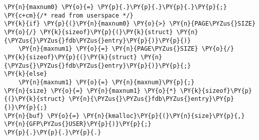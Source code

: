 \begin{Verbatim}[commandchars=\\\{\}]
\PY{n}{maxnum0} \PY{o}{=} \PY{p}{.}\PY{p}{.}\PY{p}{.}\PY{p}{;} \PY{c+cm}{/* read from userspace */} 
\PY{k}{if} \PY{p}{(}\PY{n}{maxnum0} \PY{o}{>} \PY{n}{PAGE\PYZus{}SIZE} \PY{o}{/} \PY{k}{sizeof}\PY{p}{(}\PY{k}{struct} \PY{n}{\PYZus{}\PYZus{}fdb\PYZus{}entry}\PY{p}{)}\PY{p}{)}
    \PY{n}{maxnum1} \PY{o}{=} \PY{n}{PAGE\PYZus{}SIZE} \PY{o}{/} \PY{k}{sizeof}\PY{p}{(}\PY{k}{struct} \PY{n}{\PYZus{}\PYZus{}fdb\PYZus{}entry}\PY{p}{)}\PY{p}{;}
\PY{k}{else}
    \PY{n}{maxnum1} \PY{o}{=} \PY{n}{maxnum}\PY{p}{;}
\PY{n}{size} \PY{o}{=} \PY{n}{maxnum1} \PY{o}{*} \PY{k}{sizeof}\PY{p}{(}\PY{k}{struct} \PY{n}{\PYZus{}\PYZus{}fdb\PYZus{}entry}\PY{p}{)}\PY{p}{;}
\PY{n}{buf} \PY{o}{=} \PY{n}{kmalloc}\PY{p}{(}\PY{n}{size}\PY{p}{,} \PY{n}{GFP\PYZus{}USER}\PY{p}{)}\PY{p}{;}
\PY{p}{.}\PY{p}{.}\PY{p}{.}
\end{Verbatim}
